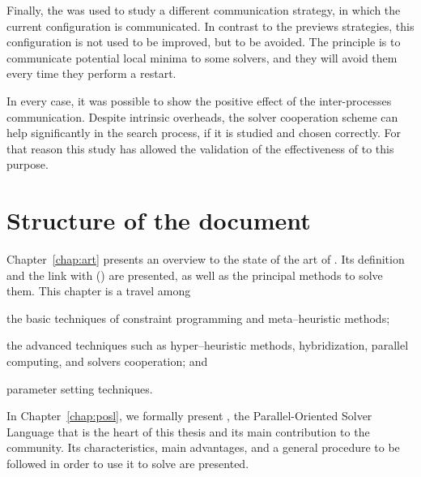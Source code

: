 Finally, the \grp{} was used to study a different communication strategy, in which the current configuration is communicated. In contrast to the previews strategies, this configuration is not used to be improved, but to be avoided. The principle is to communicate potential local minima to some solvers, and they will avoid them every time they perform a restart. 

In every case, it was possible to show the positive effect of the inter-processes communication. Despite intrinsic overheads, the solver cooperation scheme can help significantly in the search process, if it is studied and chosen correctly. For that reason this study has allowed the validation of the effectiveness of \posl{} to this purpose.

\section{Structure of the document}

Chapter~\ref{chap:art} presents an overview to the state of the art of \COPs{}. Its definition and the link with \CSPs{} (\csp) are presented, as well as the principal methods to solve them. This chapter is a travel among \begin{inparaenum}[1)] \item the basic techniques of constraint programming and meta--heuristic methods; \item the advanced techniques such as hyper--heuristic methods, hybridization, parallel computing, and solvers cooperation; and \item parameter setting techniques. \end{inparaenum}


In Chapter~\ref{chap:posl}, we formally present \posl, the Parallel-Oriented Solver Language that is the heart of this thesis and its main contribution to the community. Its characteristics, main advantages, and a general procedure to be followed in order to use it to solve \CSPs{} are
presented.

